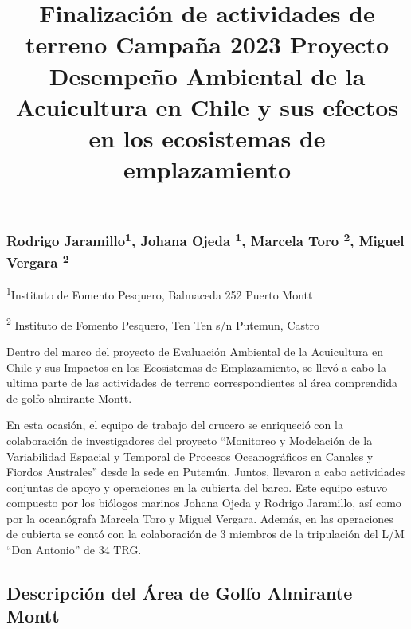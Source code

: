 \documentclass[
  letterpaper,
  DIV=11,
  numbers=noendperiod]{scrartcl}
\title{Finalización de actividades de terreno Campaña 2023 Proyecto
Desempeño Ambiental de la Acuicultura en Chile y sus efectos en los
ecosistemas de emplazamiento}
\author{}
\date{}
\begin{document}
\maketitle
\ifdefined\Shaded\renewenvironment{Shaded}{\begin{tcolorbox}[interior hidden, boxrule=0pt, borderline west={3pt}{0pt}{shadecolor}, enhanced, breakable, sharp corners, frame hidden]}{\end{tcolorbox}}\fi

\hypertarget{rodrigo-jaramillo1-johana-ojeda-1-marcela-toro-2-miguel-vergara-2}{%
\subsubsection{\texorpdfstring{Rodrigo Jaramillo\textsuperscript{1},
Johana Ojeda \textsuperscript{1}, Marcela Toro \textsuperscript{2},
Miguel Vergara
\textsuperscript{2}}{Rodrigo Jaramillo1, Johana Ojeda 1, Marcela Toro 2, Miguel Vergara 2}}\label{rodrigo-jaramillo1-johana-ojeda-1-marcela-toro-2-miguel-vergara-2}}

\textsuperscript{1}Instituto de Fomento Pesquero, Balmaceda 252 Puerto
Montt

\textsuperscript{2} Instituto de Fomento Pesquero, Ten Ten s/n Putemun,
Castro

Dentro del marco del proyecto de Evaluación Ambiental de la Acuicultura
en Chile y sus Impactos en los Ecosistemas de Emplazamiento, se llevó a
cabo la ultima parte de las actividades de terreno correspondientes al
área comprendida de golfo almirante Montt.

En esta ocasión, el equipo de trabajo del crucero se enriqueció con la
colaboración de investigadores del proyecto ``Monitoreo y Modelación de
la Variabilidad Espacial y Temporal de Procesos Oceanográficos en
Canales y Fiordos Australes'' desde la sede en Putemún. Juntos, llevaron
a cabo actividades conjuntas de apoyo y operaciones en la cubierta del
barco. Este equipo estuvo compuesto por los biólogos marinos Johana
Ojeda y Rodrigo Jaramillo, así como por la oceanógrafa Marcela Toro y
Miguel Vergara. Además, en las operaciones de cubierta se contó con la
colaboración de 3 miembros de la tripulación del L/M ``Don Antonio'' de
34 TRG.

\hypertarget{descripciuxf3n-del-uxe1rea-de-golfo-almirante-montt}{%
\subsection{Descripción del Área de Golfo Almirante
Montt}\label{descripciuxf3n-del-uxe1rea-de-golfo-almirante-montt}}
\end{document}
